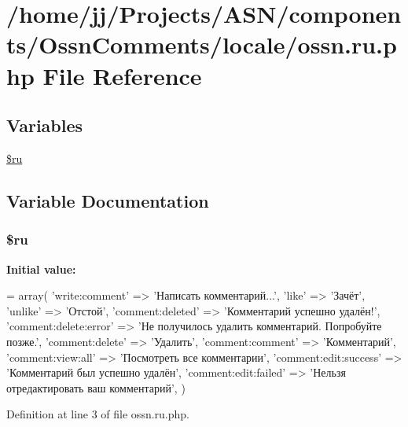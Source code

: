 \hypertarget{components_2_ossn_comments_2locale_2ossn_8ru_8php}{}\section{/home/jj/\+Projects/\+A\+S\+N/components/\+Ossn\+Comments/locale/ossn.ru.\+php File Reference}
\label{components_2_ossn_comments_2locale_2ossn_8ru_8php}
\subsection*{Variables}
\begin{DoxyCompactItemize}
\item 
\hyperlink{components_2_ossn_comments_2locale_2ossn_8ru_8php_aab84a3feda2b0e489cac7cd194e8d726}{\$ru}
\end{DoxyCompactItemize}


\subsection{Variable Documentation}
\subsubsection[{\texorpdfstring{\$ru}{$ru}}]{\setlength{\rightskip}{0pt plus 5cm}\$ru}\hypertarget{components_2_ossn_comments_2locale_2ossn_8ru_8php_aab84a3feda2b0e489cac7cd194e8d726}{}\label{components_2_ossn_comments_2locale_2ossn_8ru_8php_aab84a3feda2b0e489cac7cd194e8d726}
{\bfseries Initial value\+:}
\begin{DoxyCode}
= array(
    \textcolor{stringliteral}{'write:comment'} => \textcolor{stringliteral}{'Написать комментарий...'},
    \textcolor{stringliteral}{'like'} => \textcolor{stringliteral}{'Зачёт'},
    \textcolor{stringliteral}{'unlike'} => \textcolor{stringliteral}{'Отстой'},
    \textcolor{stringliteral}{'comment:deleted'} => \textcolor{stringliteral}{'Комментарий успешно удалён!'},
    \textcolor{stringliteral}{'comment:delete:error'} => \textcolor{stringliteral}{'Не получилось удалить комментарий. Попробуйте позже.'},
    \textcolor{stringliteral}{'comment:delete'} => \textcolor{stringliteral}{'Удалить'},
    \textcolor{stringliteral}{'comment:comment'} => \textcolor{stringliteral}{'Комментарий'},
    \textcolor{stringliteral}{'comment:view:all'} => \textcolor{stringliteral}{'Посмотреть все комментарии'},
    \textcolor{stringliteral}{'comment:edit:success'} => \textcolor{stringliteral}{'Комментарий был успешно удалён'},
    \textcolor{stringliteral}{'comment:edit:failed'} => \textcolor{stringliteral}{'Нельзя отредактировать ваш комментарий'},
)
\end{DoxyCode}


Definition at line 3 of file ossn.\+ru.\+php.

